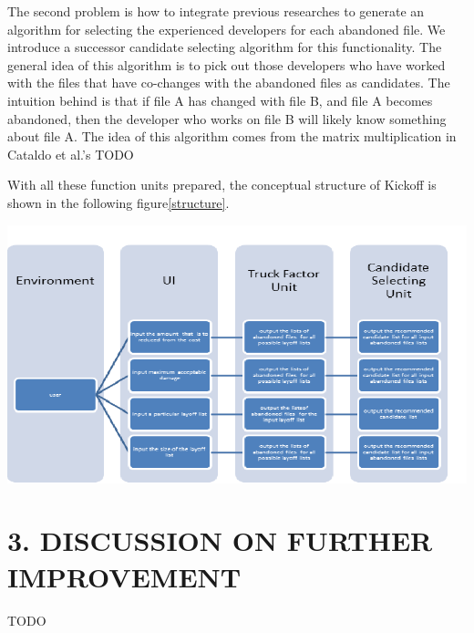 \documentclass[12pt, a4paper, openright]{report}
\begin{document}
The second problem is how to integrate previous researches to generate an algorithm for selecting the experienced developers for each abandoned file. We introduce a successor candidate selecting algorithm for this functionality. The general idea of this algorithm is to pick out those developers who have worked with the files that have co-changes with the abandoned files as candidates. The intuition behind is that if file A has changed with file B, and file A becomes abandoned, then the developer who works on file B will likely know something about file A. The idea of this algorithm comes from the matrix multiplication in Cataldo et al.'s\cite{Cataldo2006CSCW}
TODO

With all these function units prepared, the conceptual structure of Kickoff is shown in the following figure\ref{structure}.
\begin{center}
	\includegraphics[scale=0.8]{structure}
	\label{structure}
\end{center}

\newpage
\section*{3. DISCUSSION ON FURTHER IMPROVEMENT}
TODO
\newpage
\end{document}
